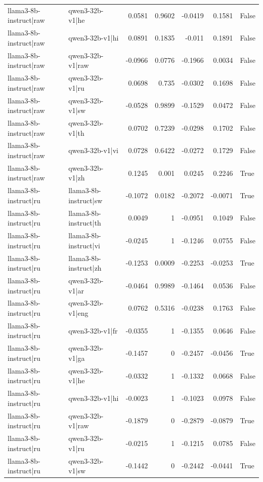 \begin{table}
\begin{tabular}{l l r r r r l}
llama3-8b-instruct|raw & qwen3-32b-v1|he & 0.0581 & 0.9602 & -0.0419 & 0.1581 & False \\
llama3-8b-instruct|raw & qwen3-32b-v1|hi & 0.0891 & 0.1835 & -0.011 & 0.1891 & False \\
llama3-8b-instruct|raw & qwen3-32b-v1|raw & -0.0966 & 0.0776 & -0.1966 & 0.0034 & False \\
llama3-8b-instruct|raw & qwen3-32b-v1|ru & 0.0698 & 0.735 & -0.0302 & 0.1698 & False \\
llama3-8b-instruct|raw & qwen3-32b-v1|sw & -0.0528 & 0.9899 & -0.1529 & 0.0472 & False \\
llama3-8b-instruct|raw & qwen3-32b-v1|th & 0.0702 & 0.7239 & -0.0298 & 0.1702 & False \\
llama3-8b-instruct|raw & qwen3-32b-v1|vi & 0.0728 & 0.6422 & -0.0272 & 0.1729 & False \\
llama3-8b-instruct|raw & qwen3-32b-v1|zh & 0.1245 & 0.001 & 0.0245 & 0.2246 & True \\
llama3-8b-instruct|ru & llama3-8b-instruct|sw & -0.1072 & 0.0182 & -0.2072 & -0.0071 & True \\
llama3-8b-instruct|ru & llama3-8b-instruct|th & 0.0049 & 1 & -0.0951 & 0.1049 & False \\
llama3-8b-instruct|ru & llama3-8b-instruct|vi & -0.0245 & 1 & -0.1246 & 0.0755 & False \\
llama3-8b-instruct|ru & llama3-8b-instruct|zh & -0.1253 & 0.0009 & -0.2253 & -0.0253 & True \\
llama3-8b-instruct|ru & qwen3-32b-v1|ar & -0.0464 & 0.9989 & -0.1464 & 0.0536 & False \\
llama3-8b-instruct|ru & qwen3-32b-v1|eng & 0.0762 & 0.5316 & -0.0238 & 0.1763 & False \\
llama3-8b-instruct|ru & qwen3-32b-v1|fr & -0.0355 & 1 & -0.1355 & 0.0646 & False \\
llama3-8b-instruct|ru & qwen3-32b-v1|ga & -0.1457 & 0 & -0.2457 & -0.0456 & True \\
llama3-8b-instruct|ru & qwen3-32b-v1|he & -0.0332 & 1 & -0.1332 & 0.0668 & False \\
llama3-8b-instruct|ru & qwen3-32b-v1|hi & -0.0023 & 1 & -0.1023 & 0.0978 & False \\
llama3-8b-instruct|ru & qwen3-32b-v1|raw & -0.1879 & 0 & -0.2879 & -0.0879 & True \\
llama3-8b-instruct|ru & qwen3-32b-v1|ru & -0.0215 & 1 & -0.1215 & 0.0785 & False \\
llama3-8b-instruct|ru & qwen3-32b-v1|sw & -0.1442 & 0 & -0.2442 & -0.0441 & True \\

\end{tabular}
\end{table}
